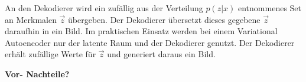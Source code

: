 An den Dekodierer wird ein zufällig aus der Verteilung $p(z|x)$ entnommenes Set an Merkmalen $\vec{z}$ übergeben.
Der Dekodierer übersetzt dieses gegebene $\vec{z}$ daraufhin in ein Bild. Im praktischen Einsatz werden bei einem Variational Autoencoder nur der latente Raum und der Dekodierer genutzt. Der Dekodierer erhält zufällige Werte für $\vec{z}$ und generiert daraus ein Bild.

\textbf{Vor- Nachteile?}

\cite{autoencoders}




